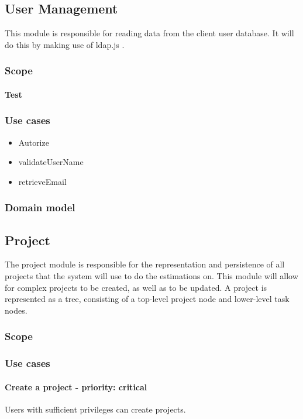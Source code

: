 \subsection{User Management}
This module is responsible for reading data from the client user database. It will do this by making use of ldap.js .
\subsubsection{Scope}
\paragraph{Test}
\subsubsection{Use cases}
\begin{itemize}
\item Autorize
\item validateUserName
\item retrieveEmail
\end{itemize}
\subsubsection{Domain model}

\subsection{Project}
The project module is responsible for the representation and persistence of all projects that the system will use to do the estimations on. This module will allow for complex projects to be created, as well as to be updated. A project is represented as a tree, consisting of a top-level project node and lower-level task nodes.

\subsubsection{Scope}

\subsubsection{Use cases}

\paragraph{Create a project - priority: critical}
Users with sufficient privileges can create projects.

